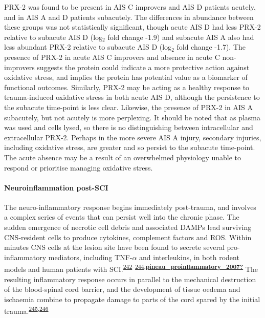 \documentclass[
]{article}
\begin{document}
PRX-2 was found to be present in AIS C improvers and AIS D patients acutely, and in AIS A and D patients subacutely.
The differences in abundance between these groups was not statistically significant, though acute AIS D had less PRX-2 relative to subacute AIS D (log\(_2\) fold change -1.9) and subacute AIS A also had less abundant PRX-2 relative to subacute AIS D (log\(_2\) fold change -1.7).
The presence of PRX-2 in acute AIS C improvers and absence in acute C non-improvers suggests the protein could indicate a more protective action against oxidative stress, and implies the protein has potential value as a biomarker of functional outcomes.
Similarly, PRX-2 may be acting as a healthy response to trauma-induced oxidative stress in both acute AIS D, although the persistence to the subacute time-point is less clear.
Likewise, the presence of PRX-2 in AIS A subacutely, but not acutely is more perplexing.
It should be noted that as plasma was used and cells lysed, so there is no distinguishing between intracellular and extracellular PRX-2.
Perhaps in the more severe AIS A injury, secondary injuries, including oxidative stress, are greater and so persist to the subacute time-point.
The acute absence may be a result of an overwhelmed physiology unable to respond or prioritise managing oxidative stress.

\hypertarget{neuroinflammation-post-sci}{%
\paragraph{Neuroinflammation post-SCI}\label{neuroinflammation-post-sci}}

The neuro-inflammatory response begins immediately post-trauma, and involves a complex series of events that can persist well into the chronic phase.
The sudden emergence of necrotic cell debris and associated DAMPs lead surviving CNS-resident cells to produce cytokines, complement factors and ROS.
Within minutes CNS cells at the lesion site have been found to secrete several pro-inflammatory mediators, including TNF-\(\alpha\) and interleukins, in both rodent models and human patients with SCI.\textsuperscript{\protect\hyperlink{ref-chandrasekar_acute_2017}{242}--\protect\hyperlink{ref-bastien_il-1_2015}{244},\protect\hyperlink{ref-pineau_proinflammatory_2007}{\textbf{pineau\_proinflammatory\_2007?}}}
The resulting inflammatory response occurs in parallel to the mechanical destruction of the blood-spinal cord barrier, and the development of tissue oedema and ischaemia combine to propagate damage to parts of the cord spared by the initial trauma.\textsuperscript{\protect\hyperlink{ref-maikos_immediate_2007}{245},\protect\hyperlink{ref-ahuja_traumatic_2017}{246}}
\end{document}
